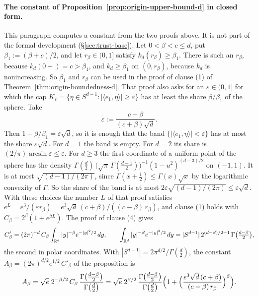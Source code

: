 \paragraph{The constant of Proposition~\ref{prop:origin-upper-bound-d} in closed form.} This
paragraph computes a constant from the two proofs above. It is not part of the formal development
(\S\ref{sec:trust-base}). Let $0 < \beta < c \le d$, put $\beta_1 := (\beta + c)/2$, and let
$r_\beta \in (0,1]$ satisfy $k_d(r_\beta) \ge \beta_1$. There is such an $r_\beta$, because
$k_d(0{+}) = c > \beta_1$, and $k_d \ge \beta_1$ on $(0,r_\beta)$, because $k_d$ is nonincreasing.
So $\beta_1$ and $r_\beta$ can be used in the proof of clause (1) of
Theorem~\ref{thm:origin-boundedness-d}. That proof also asks for an $\varepsilon \in (0,1]$ for
which the cap $K_\varepsilon = \{\eta \in S^{d-1} : |\langle e_1,\eta\rangle| \ge \varepsilon\}$
has at least the share $\beta/\beta_1$ of the sphere. Take
\[
  \varepsilon := \frac{c - \beta}{(c + \beta)\sqrt d} .
\]
Then $1 - \beta/\beta_1 = \varepsilon\sqrt d$, so it is enough that the band
$\{|\langle e_1,\eta\rangle| < \varepsilon\}$ has at most the share $\varepsilon\sqrt d$. For
$d = 1$ the band is empty. For $d = 2$ its share is $(2/\pi)\arcsin\varepsilon \le \varepsilon$.
For $d \ge 3$ the first coordinate of a uniform point of the sphere has the density
$\Gamma(\tfrac d2)\,\bigl(\sqrt\pi\,\Gamma(\tfrac{d-1}2)\bigr)^{-1}(1 - u^2)^{(d-3)/2}$ on $(-1,1)$.
It is at most $\sqrt{(d-1)/(2\pi)}$, since $\Gamma(x + \tfrac12) \le \Gamma(x)\sqrt x$ by the
logarithmic convexity of $\Gamma$. So the share of the band is at most
$2\varepsilon\sqrt{(d-1)/(2\pi)} \le \varepsilon\sqrt d$. With these choices the number $L$ of
that proof satisfies $e^{L} = e^3/(\varepsilon r_\beta) = e^3\sqrt d\,(c+\beta)/((c-\beta)\,r_\beta)$,
and clause (1) holds with $C_\beta = 2^\beta(1 + e^{\beta L})$. The proof of clause (4) gives
\[
  C'_\beta = (2\pi)^{-d}\,C_\beta\int_{\mathbb{R}^d}|y|^{-\beta}e^{-|y|^2/2}\,dy ,
  \qquad
  \int_{\mathbb{R}^d}|y|^{-\beta}e^{-|y|^2/2}\,dy
   = |S^{d-1}|\,2^{(d-\beta)/2-1}\,\Gamma\bigl(\tfrac{d-\beta}{2}\bigr) ,
\]
the second in polar coordinates. With $|S^{d-1}| = 2\pi^{d/2}/\Gamma(\tfrac d2)$, the constant
$A_\beta = (2\pi)^{d/2}e^{1/2}\,C'_\beta$ of the proposition is
\[
  A_\beta = \sqrt e\;2^{-\beta/2}\,C_\beta\,
    \frac{\Gamma\bigl(\tfrac{d-\beta}{2}\bigr)}{\Gamma\bigl(\tfrac d2\bigr)}
  = \sqrt e\;2^{\beta/2}\,\frac{\Gamma\bigl(\tfrac{d-\beta}{2}\bigr)}{\Gamma\bigl(\tfrac d2\bigr)}
    \Bigl(1 + \Bigl(\frac{e^3\sqrt d\,(c + \beta)}{(c - \beta)\,r_\beta}\Bigr)^{\beta}\Bigr) .
\]

